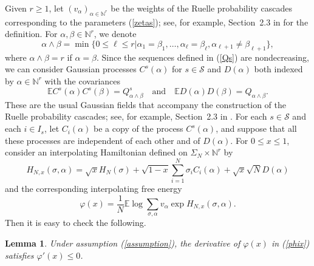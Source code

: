 \documentclass[aop,MSNbibl,dvips]{arximspdf}
\def\cal{\mathscr}
\newcommand{\spe}{{\cal S}}
\newcommand{\smsp}{}
\newcommand{\e}{\mathbb{E}}
\newcommand{\Natural}{\mathbb{N}}
\newtheorem{lemma}{Lemma}
\begin{document}
Given $r\geq1$, let $(v_\alpha)_{\alpha\in\Natural^r}$ be the weights
of the Ruelle probability cascades \cite{Ruelle} corresponding to the
parameters (\ref{zetas}); see, for example, Section~2.3 in \cite{SKmodel} for the definition. For $\alpha, \beta\in\Natural^r$, we denote
%
\begin{equation}
\alpha\wedge\beta= \min \{0\leq\ell\leq r | \alpha_1= \beta
_1, \ldots, \alpha_{\ell} = \beta_{\ell},
\alpha_{\ell+1} \neq \beta _{\ell+1} \},
\end{equation}
%
where $\alpha\wedge\beta=r$ if $\alpha=\beta$. Since the sequences
defined in (\ref{Qs}) are nondecreasing, we can consider Gaussian
processes $C^s(\alpha)$ for $s\in\spe$ and $D(\alpha)$ both indexed by
$\alpha\in\Natural^r$ with the covariances
%
\begin{equation}
\e C^s(\alpha) C^s(\beta) = Q^s_{\alpha\wedge\beta}
\quad\mbox{and}\quad \e D(\alpha) D(\beta) = Q_{\alpha\wedge\beta}. \label{CD}
\end{equation}
%
These are the usual Gaussian fields that accompany the construction of
the Ruelle probability cascades; see, for example, Section~2.3 in \cite{SKmodel}. For each $s\in\spe$ and each $i\in I_s$, let $C_i(\alpha)$
be a copy of the process $C^s(\alpha)$, and suppose that all these
processes are independent of each other and of $D(\alpha)$. For $0\leq
x\leq1$, consider an interpolating Hamiltonian defined on $\Sigma
_N\times\Natural^r$ by
%
\begin{equation}
H_{N,x}(\sigma,\alpha) = \sqrt{x} H_N(\sigma) + \sqrt{1-x}
\smsp\sum_{i=1}^N \sigma_i
C_{i}(\alpha) +\sqrt{x} \sqrt{N} D(\alpha) \label{HNx}
\end{equation}
%
and the corresponding interpolating free energy
%
\begin{equation}
\varphi(x)=\frac{1}{N}\smsp\e\log\sum_{\sigma,\alpha}
v_{\alpha
} \exp H_{N, x}(\sigma,\alpha). \label{phix}
\end{equation}
%
Then it is easy to check the following.

\begin{lemma}
Under assumption (\ref{assumption}), the derivative of $\varphi(x)$ in
(\ref{phix}) satisfies $\varphi'(x)\leq0$.
\end{lemma}
\end{document}
